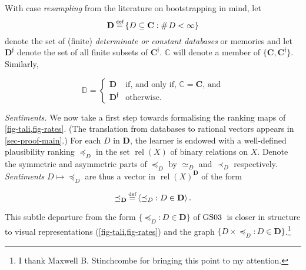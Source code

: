 \documentclass[ecta,nameyear,draft]{econsocart}
\newcommand{\countof}{\mathbin{\#}\hskip1pt}
\newcommand\defeq{\mathrel{\overset{\makebox[0pt]{\mbox{\normalfont\tiny def}}}{=}}}%
\newcommand{\relations}{\operatorname{rel}}
\newcommand{\novel}{\mathfrak f}
\newcommand{\precb}{\mathbin{\prec}}
\newcommand{\preceqb}{\mathbin{\preceq}}
\newcommand{\mbbd}{{\mathbf D}}
\newcommand{\mbbdp}{{\mathbf D^{\novel}}}
\newcommand{\dpp}{{\mathds D}}
\newcommand{\mbbc}{{\mathbf C}}
\newcommand{\mbbcp}{{\mathbf C^{\novel}}}
\newcommand{\cpp}{{\mathds C}}
\newcommand{\lbc}{\left\{}
\newcommand{\rbc}{\right\}}
\newcommand{\gsii}{$\textup{GS03}$}
\theoremstyle{plain}
\theoremstyle{remark}
\begin{document}
With case \emph{resampling} from the literature on bootstrapping in mind, let
\begin{equation*}
  \mbbd\defeq \lbc D\subseteq \mbbc: \countof D < \infty \rbc
\end{equation*} denote the set of (finite) \emph{determinate or constant
databases} or memories and let $\mbbdp$ denote the set of all
finite subsets of $\mbbcp$. $\cpp$ will denote a member of $\{\mbbc, \mbbcp\}$.
Similarly, 
\begin{linenomath*} \begin{equation*} \text{$\dpp$} = \left\{\begin{array}{ll}
    \mbbd & \text{if, and only if, $\cpp = \mbbc$, and}\\ \mbbdp &
\text{otherwise.} \end{array}\right.  \end{equation*}
\end{linenomath*}

\emph{Sentiments.} We now take a first step towards formalising the ranking
maps of \cref{fig-tali,fig-rates}.  (The translation from databases to
rational vectors appears in \cref{sec-proof-main}.) For each $D$ in $\mbbd$, the
learner is endowed with a well-defined plausibility ranking $\preceqb_D$ in the
set $\relations(X)$ of binary relations on $X$.  Denote the symmetric and
asymmetric parts of $\preceqb_D$ by $\simeq _D$ and $\precb_D$ respectively. 
\emph{Sentiments} $D \mapsto \preceqb_{D}$ are thus a vector in
$\relations(X)^{\mbbd}$ of the form
\begin{linenomath*}
  \begin{equation*}\preceqb_{\mbbd} \defeq \langle\preceqb_{D} : D\in
  \mbbd\rangle\,.\end{equation*}
\end{linenomath*}
This subtle departure from the form $\{\preceqb_{D} : D \in \mbbd\}$ of \gsii\
is closer in structure to visual representations (\cref{fig-tali,fig-rates})
and the graph $\{D \times \preceqb_{D} : D \in \mbbd\}$.\footnote{I thank
Maxwell B.  Stinchcombe for bringing this point to my attention.}
\end{document}
